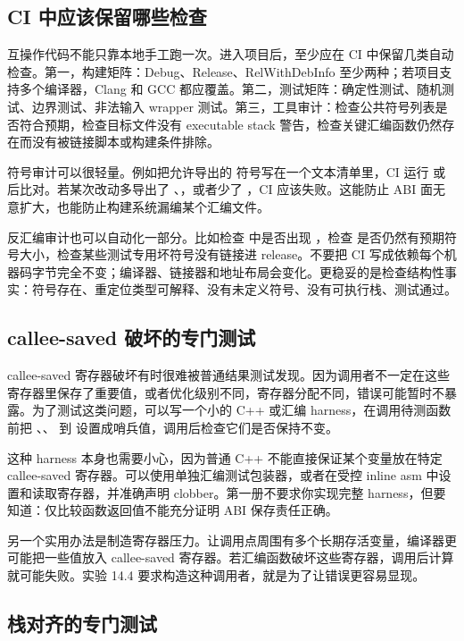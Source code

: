 \subsection{CI 中应该保留哪些检查}

互操作代码不能只靠本地手工跑一次。进入项目后，至少应在 CI 中保留几类自动检查。第一，构建矩阵：Debug、Release、RelWithDebInfo 至少两种；若项目支持多个编译器，Clang 和 GCC 都应覆盖。第二，测试矩阵：确定性测试、随机测试、边界测试、非法输入 wrapper 测试。第三，工具审计：检查公共符号列表是否符合预期，检查目标文件没有 executable stack 警告，检查关键汇编函数仍然存在而没有被链接脚本或构建条件排除。

符号审计可以很轻量。例如把允许导出的  符号写在一个文本清单里，CI 运行  或  后比对。若某次改动多导出了 、，或者少了 ，CI 应该失败。这能防止 ABI 面无意扩大，也能防止构建系统漏编某个汇编文件。

反汇编审计也可以自动化一部分。比如检查  中是否出现 ，检查  是否仍然有预期符号大小，检查某些测试专用坏符号没有链接进 release。不要把 CI 写成依赖每个机器码字节完全不变；编译器、链接器和地址布局会变化。更稳妥的是检查结构性事实：符号存在、重定位类型可解释、没有未定义符号、没有可执行栈、测试通过。

\subsection{callee-saved 破坏的专门测试}

callee-saved 寄存器破坏有时很难被普通结果测试发现。因为调用者不一定在这些寄存器里保存了重要值，或者优化级别不同，寄存器分配不同，错误可能暂时不暴露。为了测试这类问题，可以写一个小的 C++ 或汇编 harness，在调用待测函数前把 、、 到  设置成哨兵值，调用后检查它们是否保持不变。

这种 harness 本身也需要小心，因为普通 C++ 不能直接保证某个变量放在特定 callee-saved 寄存器。可以使用单独汇编测试包装器，或者在受控 inline asm 中设置和读取寄存器，并准确声明 clobber。第一册不要求你实现完整 harness，但要知道：仅比较函数返回值不能充分证明 ABI 保存责任正确。

另一个实用办法是制造寄存器压力。让调用点周围有多个长期存活变量，编译器更可能把一些值放入 callee-saved 寄存器。若汇编函数破坏这些寄存器，调用后计算就可能失败。实验 14.4 要求构造这种调用者，就是为了让错误更容易显现。

\subsection{栈对齐的专门测试}

